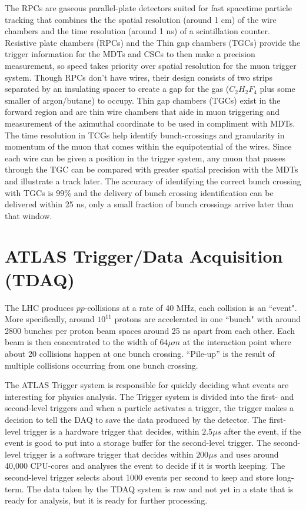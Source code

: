 The RPCs are gaseous parallel-plate detectors suited for fast spacetime particle tracking that combines the the spatial resolution (around 1 cm) of the wire chambers and the time resolution (around 1 ns) of a scintillation counter.
Resistive plate chambers (RPCs) and the Thin gap chambers (TGCs) provide the trigger information for the MDTs and CSCs to then make a precision measurement, so speed takes priority over spatial resolution for the muon trigger system. 
Though RPCs don't have wires, their design consists of two strips separated by an insulating spacer to create a gap for the gas ($C_2 H_2 F_4$ plus some smaller of argon/butane) to occupy.
Thin gap chambers (TGCs) exist in the forward region and are thin wire chambers that aide in muon triggering and measurement of the azimuthal coordinate to be used in compliment with MDTs.
The time resolution in TCGs help identify bunch-crossings and granularity in momentum of the muon that comes within the equipotential of the wires. 
Since each wire can be given a position in the trigger system, any muon that passes through the TGC can be compared with greater spatial precision with the MDTs and illustrate a track later.
The accuracy of identifying the correct bunch crossing with TGCs is 99\% and the delivery of bunch crossing identification can be delivered within 25 ns, only a small fraction of bunch crossings arrive later than that window.

\section{ATLAS Trigger/Data Acquisition (TDAQ)}

The LHC produces $pp$-collisions at a rate of 40 MHz, each collision is an ``event". 
More specifically, around $10^{11}$ protons are accelerated in one ``bunch" with around 2800 bunches per proton beam spaces around 25 ns apart from each other. 
Each beam is then concentrated to the width of $64 \mu m$ at the interaction point where about 20 collisions happen at one bunch crossing. 
``Pile-up'' is the result of multiple collisions occurring from one bunch crossing.

The ATLAS Trigger system is responsible for quickly deciding what events are interesting for physics analysis.
The Trigger system is divided into the first- and second-level triggers and when a particle activates a trigger, the trigger makes a decision to tell the DAQ to save the data produced by the detector. 
The first-level trigger is a hardware trigger that decides, within $2.5 \mu s$ after the event, if the event is good to put into a storage buffer for the second-level trigger.
The second-level trigger is a software trigger that decides within $200 \mu s$ and uses around 40,000 CPU-cores and analyses the event to decide if it is worth keeping. 
The second-level trigger selects about 1000 events per second to keep and store long-term.\cite{Trigger-DAQ}
The data taken by the TDAQ system is raw and not yet in a state that is ready for analysis, but it is ready for further processing. 

